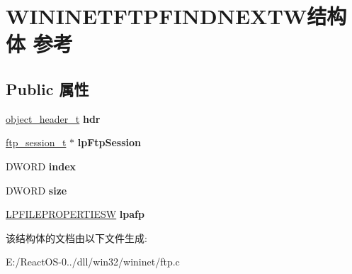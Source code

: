 \hypertarget{struct_w_i_n_i_n_e_t_f_t_p_f_i_n_d_n_e_x_t_w}{}\section{W\+I\+N\+I\+N\+E\+T\+F\+T\+P\+F\+I\+N\+D\+N\+E\+X\+T\+W结构体 参考}
\label{struct_w_i_n_i_n_e_t_f_t_p_f_i_n_d_n_e_x_t_w}
\subsection*{Public 属性}
\begin{DoxyCompactItemize}
\item 
\mbox{\label{struct_w_i_n_i_n_e_t_f_t_p_f_i_n_d_n_e_x_t_w_ac40d4ee296cb73ebbf6eb95a758f07e6}} 
\hyperlink{struct__object__header__t}{object\+\_\+header\+\_\+t} {\bfseries hdr}
\item 
\mbox{\label{struct_w_i_n_i_n_e_t_f_t_p_f_i_n_d_n_e_x_t_w_a8e9a85c248c47d4aedf5246638abf1ca}} 
\hyperlink{struct__ftp__session__t}{ftp\+\_\+session\+\_\+t} $\ast$ {\bfseries lp\+Ftp\+Session}
\item 
\mbox{\label{struct_w_i_n_i_n_e_t_f_t_p_f_i_n_d_n_e_x_t_w_a0fc31517a8dfe5636d84148341eb2d54}} 
D\+W\+O\+RD {\bfseries index}
\item 
\mbox{\label{struct_w_i_n_i_n_e_t_f_t_p_f_i_n_d_n_e_x_t_w_ac36c5b0c7a623ac10b4fc6d00586dd10}} 
D\+W\+O\+RD {\bfseries size}
\item 
\mbox{\label{struct_w_i_n_i_n_e_t_f_t_p_f_i_n_d_n_e_x_t_w_af55651131f1ccbb718812f84775a8a27}} 
\hyperlink{struct_f_i_l_e_p_r_o_p_e_r_t_i_e_s_w}{L\+P\+F\+I\+L\+E\+P\+R\+O\+P\+E\+R\+T\+I\+E\+SW} {\bfseries lpafp}
\end{DoxyCompactItemize}


该结构体的文档由以下文件生成\+:\begin{DoxyCompactItemize}
\item 
E\+:/\+React\+O\+S-\/0../dll/win32/wininet/ftp.\+c\end{DoxyCompactItemize}
